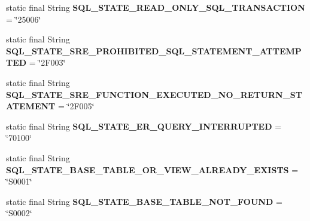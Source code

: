 \begin{DoxyCompactItemize}
\mbox{\label{classcom_1_1mysql_1_1jdbc_1_1_s_q_l_error_a4e8fa4352e69cdfaa6ad06a5c0438270}} 
static final String {\bfseries S\+Q\+L\+\_\+\+S\+T\+A\+T\+E\+\_\+\+R\+E\+A\+D\+\_\+\+O\+N\+L\+Y\+\_\+\+S\+Q\+L\+\_\+\+T\+R\+A\+N\+S\+A\+C\+T\+I\+ON} = \char`\"{}25006\char`\"{}
\item 
\mbox{\label{classcom_1_1mysql_1_1jdbc_1_1_s_q_l_error_acad3c04c1bd024b3b448925c1356282b}} 
static final String {\bfseries S\+Q\+L\+\_\+\+S\+T\+A\+T\+E\+\_\+\+S\+R\+E\+\_\+\+P\+R\+O\+H\+I\+B\+I\+T\+E\+D\+\_\+\+S\+Q\+L\+\_\+\+S\+T\+A\+T\+E\+M\+E\+N\+T\+\_\+\+A\+T\+T\+E\+M\+P\+T\+ED} = \char`\"{}2\+F003\char`\"{}
\item 
\mbox{\label{classcom_1_1mysql_1_1jdbc_1_1_s_q_l_error_a8a35bde32ca16811a3fbca25f9dc160f}} 
static final String {\bfseries S\+Q\+L\+\_\+\+S\+T\+A\+T\+E\+\_\+\+S\+R\+E\+\_\+\+F\+U\+N\+C\+T\+I\+O\+N\+\_\+\+E\+X\+E\+C\+U\+T\+E\+D\+\_\+\+N\+O\+\_\+\+R\+E\+T\+U\+R\+N\+\_\+\+S\+T\+A\+T\+E\+M\+E\+NT} = \char`\"{}2\+F005\char`\"{}
\item 
\mbox{\label{classcom_1_1mysql_1_1jdbc_1_1_s_q_l_error_a5d75128caa2c42b65959ba833a7153b8}} 
static final String {\bfseries S\+Q\+L\+\_\+\+S\+T\+A\+T\+E\+\_\+\+E\+R\+\_\+\+Q\+U\+E\+R\+Y\+\_\+\+I\+N\+T\+E\+R\+R\+U\+P\+T\+ED} = \char`\"{}70100\char`\"{}
\item 
\mbox{\label{classcom_1_1mysql_1_1jdbc_1_1_s_q_l_error_a2ac009ad91538b2ccb78d354e0a64c51}} 
static final String {\bfseries S\+Q\+L\+\_\+\+S\+T\+A\+T\+E\+\_\+\+B\+A\+S\+E\+\_\+\+T\+A\+B\+L\+E\+\_\+\+O\+R\+\_\+\+V\+I\+E\+W\+\_\+\+A\+L\+R\+E\+A\+D\+Y\+\_\+\+E\+X\+I\+S\+TS} = \char`\"{}S0001\char`\"{}
\item 
\mbox{\label{classcom_1_1mysql_1_1jdbc_1_1_s_q_l_error_ab0ed197f79e218f3851bdb282d44f8ca}} 
static final String {\bfseries S\+Q\+L\+\_\+\+S\+T\+A\+T\+E\+\_\+\+B\+A\+S\+E\+\_\+\+T\+A\+B\+L\+E\+\_\+\+N\+O\+T\+\_\+\+F\+O\+U\+ND} = \char`\"{}S0002\char`\"{}
\item 
\mbox{\label{classcom_1_1mysql_1_1jdbc_1_1_s_q_l_error_a912e1ec449b92d9af82ea0ff26adbbf5}} 

\end{DoxyCompactItemize}
